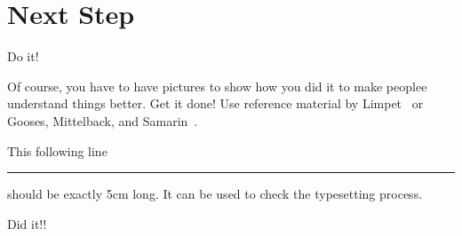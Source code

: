 \documentclass[12pt]{dalthesis}
\begin{document}
\section{Next Step}

Do it!

Of course, you have to have pictures to show how you did it to make peoplee
understand things better.
Get it done!  Use reference material by Limpet~ \cite{jain2010data} or
Gooses, Mittelback, and Samarin~.

This following line \rule{5cm}{3pt} should be exactly 5cm long.  It
can be used to check the typesetting process.

Did it!!


\end{document}
